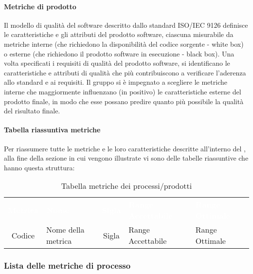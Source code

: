 \paragraph{Metriche di prodotto}
Il modello di qualità del software descritto dallo standard ISO/IEC 9126 definisce le caratteristiche e gli attributi del prodotto software, ciascuna misurabile da metriche interne (che richiedono la disponibilità del codice sorgente - white box) o esterne (che richiedono il prodotto software in esecuzione - black box).
Una volta specificati i requisiti di qualità del prodotto software, si identificano le caratteristiche e attributi di qualità che più contribuiscono a verificare l'aderenza allo standard e ai requisiti.
Il gruppo \Gruppo{} si è impegnato a scegliere le metriche interne che maggiormente influenzano (in positivo) le caratteristiche esterne del prodotto finale, in modo che esse possano predire quanto più possibile la qualità del risultato finale. 

\paragraph{Tabella riassuntiva metriche}
Per riassumere tutte le metriche e le loro caratteristiche descritte all'interno del \PdQ{}, alla fine della sezione in cui vengono illustrate vi sono delle tabelle riassuntive che hanno questa struttura:
{
\renewcommand{\arraystretch}{1.5}
\begin{longtable}{ c C{4cm} c C{3.5cm} C{3.5cm}}
\caption{Tabella metriche dei processi/prodotti}\\
\textcolor{white}{\textbf{Metrica}} & \textcolor{white}{\textbf{Nome}} & \textcolor{white}{\textbf{Sigla}} & \textcolor{white}{\textbf{Range Accettabile}} & \textcolor{white}{\textbf{Range Ottimale}}\\
Codice & Nome della metrica & Sigla & Range Accettabile & Range Ottimale \\
\end{longtable}
}

\subsubsection{Lista delle metriche di processo}
